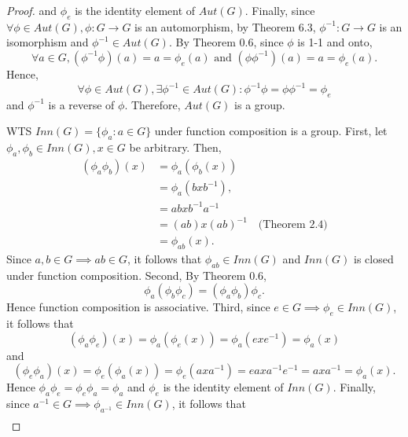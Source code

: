 \documentclass{article}
\theoremstyle{definition}
\begin{document}
\begin{proof}
     and $\phi_e$ is the identity element of $Aut(G)$. Finally, since $\forall \phi \in Aut(G), \phi:G \to G$ is an automorphism, by Theorem 6.3, $\phi^{-1}: G \to G$ is an isomorphism and $\phi^{-1} \in Aut(G)$. By Theorem 0.6, since $\phi$ is 1-1 and onto,
     \begin{equation*}
         \forall a \in G, (\phi^{-1}\phi)(a) = a = \phi_e(a) \text{ and } (\phi\phi^{-1})(a) = a = \phi_e(a).
     \end{equation*}
     Hence,
     \begin{equation*}
         \forall \phi \in Aut(G), \exists \phi^{-1} \in Aut(G): \phi^{-1}\phi = \phi\phi^{-1} = \phi_e
     \end{equation*}
     and $\phi^{-1}$ is a reverse of $\phi$. Therefore, $Aut(G)$ is a group.
     
     WTS $Inn(G) = \{\phi_a: a\in G\}$ under function composition is a group. First, let $\phi_a,\phi_b \in Inn(G), x \in G$ be arbitrary. Then,
     \begin{align*}
         (\phi_a\phi_b)(x) &= \phi_a(\phi_b(x)) \\
         &= \phi_a(bxb^{-1}), \\
         &= abxb^{-1}a^{-1} \\
         &= (ab)x(ab)^{-1} \quad \text{(Theorem 2.4)}\\
         &= \phi_{ab}(x).
     \end{align*}
     Since $a,b \in G \implies ab \in G$, it follows that $\phi_{ab} \in Inn(G)$ and $Inn(G)$ is closed under function composition. Second, By Theorem 0.6,
     \begin{equation*}
         \phi_a(\phi_b\phi_c) = (\phi_a\phi_b)\phi_c.
     \end{equation*}
     Hence function composition is associative. Third, since $e \in G \implies \phi_e \in Inn(G)$, it follows that
     \begin{equation*}
         (\phi_a\phi_e)(x) = \phi_a(\phi_e(x)) = \phi_a(exe^{-1}) = \phi_a(x)
     \end{equation*}
     and
     \begin{equation*}
         (\phi_e\phi_a)(x) = \phi_e(\phi_a(x)) = \phi_e(axa^{-1}) = eaxa^{-1}e^{-1} = axa^{-1} = \phi_a(x).
     \end{equation*}
     Hence $\phi_a\phi_e = \phi_e\phi_a = \phi_a$ and $\phi_e$ is the identity element of $Inn(G)$. Finally, since $a^{-1} \in G \implies \phi_{a^{-1}} \in Inn(G)$, it follows that
     \begin{align*}

\end{align*}
\end{proof}
\end{document}
